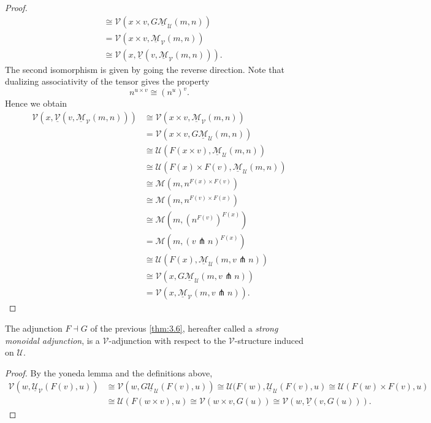 \begin{proof}
\begin{align*}
										  &\cong \mathcal{V} (x\times v,G\underline{\mathcal{M} } _\mathcal{U} (m,n))\\
										  &=\mathcal{V} (x\times v,\underline{\mathcal{M} } _\mathcal{V} (m,n))\\
										  &\cong \mathcal{V} (x,\underline{\mathcal{V} } (v,\underline{\mathcal{M} } _{\mathcal{V} } (m,n)))
	.\end{align*}
	The second isomorphism is given by going the reverse direction. Note that dualizing associativity of the tensor gives the property
	\[
		n^{u\times v} \cong (n^u)^v
	.\]
	Hence we obtain
	\begin{align*}
		\mathcal{V} (x,\underline{\mathcal{V} } (v,\underline{\mathcal{M} } _\mathcal{V} (m,n)))&\cong \mathcal{V} (x\times v,\underline{\mathcal{M} } _\mathcal{V} (m,n))\\
												      &= \mathcal{V} (x\times v,G\underline{\mathcal{M} } _\mathcal{U} (m,n))\\
												      &\cong \mathcal{U} (F(x\times v),\underline{\mathcal{M} } _\mathcal{U} (m,n))\\
												      &\cong \mathcal{U} (F(x)\times F(v),\underline{\mathcal{M} } _\mathcal{U} (m,n))\\
												      &\cong \mathcal{M} (m,n^{F(x)\times F(v)} )\\
												      &\cong \mathcal{M} (m,n^{F(v)\times F(x)} )\\
												      &\cong \mathcal{M} (m,( n^{F(v)})^{F(x)})\\
												      &=\mathcal{M} (m,(v\pitchfork n)^{F(x)} )\\
												      &\cong \mathcal{U} (F(x),\underline{\mathcal{M} } _\mathcal{U} (m,v\pitchfork n))\\
												      &\cong \mathcal{V} (x,G\underline{\mathcal{M} } _\mathcal{U} (m,v\pitchfork n))\\
												      &=\mathcal{V} (x,\underline{\mathcal{M} } _\mathcal{V} (m,v\pitchfork n))
.\end{align*}
\end{proof}

\begin{corollary}\label{cor:3.1}
	The adjunction $F\dashv G$ of the previous \cref{thm:3.6}, hereafter called a \emph{strong monoidal adjunction}, is a $\mathcal{V} $-adjunction with respect to the $\mathcal{V} $-structure induced on $\mathcal{U} $.
\end{corollary}
\begin{proof}
	By the yoneda lemma and the definitions above,
	\begin{align*}
		\mathcal{V} (w,\underline{\mathcal{U} } _\mathcal{V} (F(v),u))&\cong \mathcal{V} (w, G\underline{\mathcal{U} } _\mathcal{U} (F(v),u))\cong \mathcal{U} (F(w),\underline{\mathcal{U}}_\mathcal{U} (F(v),u)\cong \mathcal{U} (F(w)\times F(v),u)\\
									      &\cong\mathcal{U} (F(w\times v),u)\cong \mathcal{V} (w\times v,G(u))\cong \mathcal{V} (w,\underline{\mathcal{V} } (v,G(u)))
	.\end{align*}
\end{proof}


